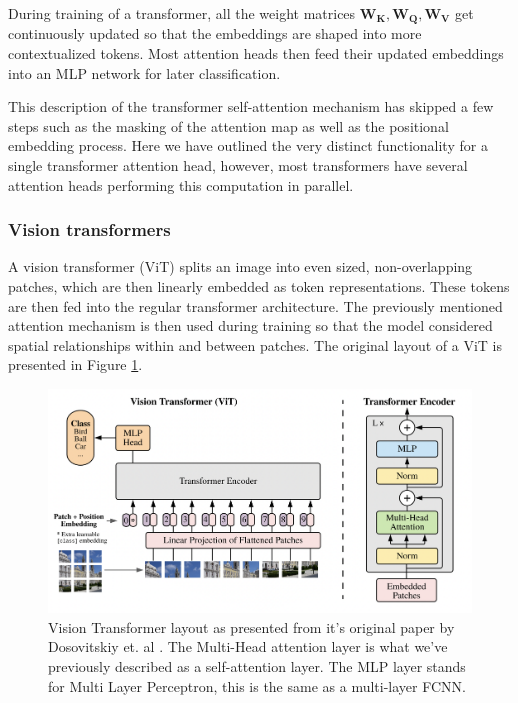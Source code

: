 During training of a transformer, all the weight matrices $\boldsymbol{W_K, W_Q , W_V}$ get continuously updated so that the embeddings are shaped into more contextualized tokens. Most attention heads then feed their updated embeddings into an MLP network for later classification. 

This description of the transformer self-attention mechanism has skipped a few steps such as the masking of the attention map as well as the positional embedding process. Here we have outlined the very distinct functionality for a single transformer attention head, however, most transformers have several attention heads performing this computation in parallel. 

\subsubsection{Vision transformers}

A vision transformer (ViT) splits an image into even sized, non-overlapping patches, which are then linearly embedded
as token representations. These tokens are then fed into the regular transformer architecture. The previously mentioned attention mechanism is then used during training
so that the model considered spatial relationships within and between patches. The original layout of a ViT is presented in Figure \ref{fig:ViT}.


\begin{figure}[H]
    \centering
    \includegraphics[width=1\linewidth]{examples/tests_eb/figs/vit.png}
    \caption{Vision Transformer layout as presented from it's original paper by Dosovitskiy et. al \cite{first_vit}. The Multi-Head attention layer is what we've previously described as a self-attention layer. The MLP layer stands for Multi Layer Perceptron, this is the same as a multi-layer FCNN.}
    \label{fig:ViT}
\end{figure}

